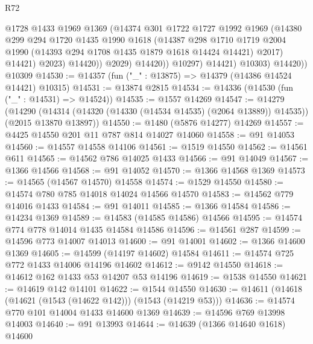 \begin{lexlean}{R72}
\begin{coremodule}
                        @1728
                        @1433
                        @1969
                        @1369
                        (@14374
                          @301
                          @1722
                          @1727
                          @1992
                          @1969
                          (@14380
                            @299
                            @294
                            @1720
                            @1435
                            @1990
                            @1618
                            (@14387
                              @298
                              @1710
                              @1719
                              @2004
                              @1990
                              (@14393 @294 @1708 @1435 @1879 @1618 @14424 @14421)
                              @2017)
                            @14421)
                          @2023)
                        @14420))
                    @2029)
                  @14420))
              @10297)
            @14421)
          @10303)
        @14420))
    @10309
@14530 := @14357 (fun ("_" : @13875) => @14379 (@14386 @14524 @14421) @10315)
@14531 := @13874 @2815
@14534 := @14336 (@14530 (fun ("_" : @14531) => @14524))
@14535 := @1557 @14269
@14547 := @14279
    (@14290 (@14314 (@14320 (@14330 (@14534 @14535) (@2064 @13889)) @14535)) (@2015 @13870 @13897))
@14550 := @1480 (@5876 @14277) @14269
@14557 := @4425 @14550 @201 @11 @787 @814 @14027 @14060
@14558 := @91 @14053
@14560 := @14557 @14558 @14106
@14561 := @1519 @14550
@14562 := @14561 @611
@14565 := @14562 @786 @14025 @1433
@14566 := @91 @14049
@14567 := @1366 @14566
@14568 := @91 @14052
@14570 := @1366 @14568 @1369
@14573 := @14565 (@14567 @14570) @14558
@14574 := @1529 @14550
@14580 := @14574 @780 @785 @14018 @14024 @14566 @14570
@14583 := @14562 @779 @14016 @1433
@14584 := @91 @14011
@14585 := @1366 @14584
@14586 := @14234 @1369
@14589 := @14583 (@14585 @14586) @14566
@14595 := @14574 @774 @778 @14014 @1435 @14584 @14586
@14596 := @14561 @287
@14599 := @14596 @773 @14007 @14013
@14600 := @91 @14001
@14602 := @1366 @14600 @1369
@14605 := @14599 (@14197 @14602) @14584
@14611 := @14574 @725 @772 @1433 @14006 @14196 @14602
@14612 := @9142 @14550
@14618 := @14612 @162 @1433 @53 @14207 @53 @14196
@14619 := @1538 @14550
@14621 := @14619 @142 @14101
@14622 := @1544 @14550
@14630 := @14611 (@14618 (@14621 (@1543 (@14622 @142))) (@1543 (@14219 @53)))
@14636 := @14574 @770 @101 @14004 @1433 @14600 @1369
@14639 := @14596 @769 @13998 @14003
@14640 := @91 @13993
@14644 := @14639 (@1366 @14640 @1618) @14600

\end{coremodule}
\end{lexlean}

